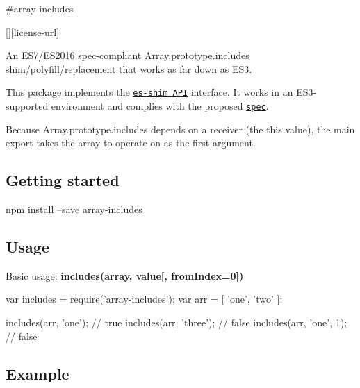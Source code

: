 \#array-\/includes \textsuperscript{\href{https://npmjs.org/package/array-includes}{\tt }}

\href{https://travis-ci.org/ljharb/array-includes}{\tt } \href{https://david-dm.org/ljharb/array-includes}{\tt } \href{https://david-dm.org/ljharb/array-includes#info=devDependencies}{\tt } \mbox{[}\mbox{]}\mbox{[}license-\/url\mbox{]} \href{http://npm-stat.com/charts.html?package=array-includes}{\tt }

\href{https://npmjs.org/package/array-includes}{\tt }

\href{https://ci.testling.com/ljharb/array-includes}{\tt }

An E\+S7/\+E\+S2016 spec-\/compliant {\ttfamily Array.\+prototype.\+includes} shim/polyfill/replacement that works as far down as E\+S3.

This package implements the \href{https://github.com/es-shims/api}{\tt es-\/shim A\+PI} interface. It works in an E\+S3-\/supported environment and complies with the proposed \href{http://www.ecma-international.org/ecma-262/6.0/}{\tt spec}.

Because {\ttfamily Array.\+prototype.\+includes} depends on a receiver (the {\ttfamily this} value), the main export takes the array to operate on as the first argument.

\subsection*{Getting started}


\begin{DoxyCode}
npm install --save array-includes
\end{DoxyCode}


\subsection*{Usage}

Basic usage\+: {\bfseries includes(array, value\mbox{[}, from\+Index=0\mbox{]})}


\begin{DoxyCode}
var includes = require('array-includes');
var arr = [ 'one', 'two' ];

includes(arr, 'one'); // true
includes(arr, 'three'); // false
includes(arr, 'one', 1); // false
\end{DoxyCode}


\subsection*{Example}


